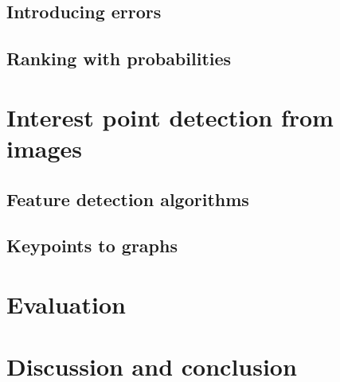 \documentclass{article}
\begin{document}
\subsection{Introducing errors}

\subsection{Ranking with probabilities}



\section{Interest point detection from images}

\subsection{Feature detection algorithms}

\subsection{Keypoints to graphs}

\section{Evaluation}

\section{Discussion and conclusion}









\end{document}
